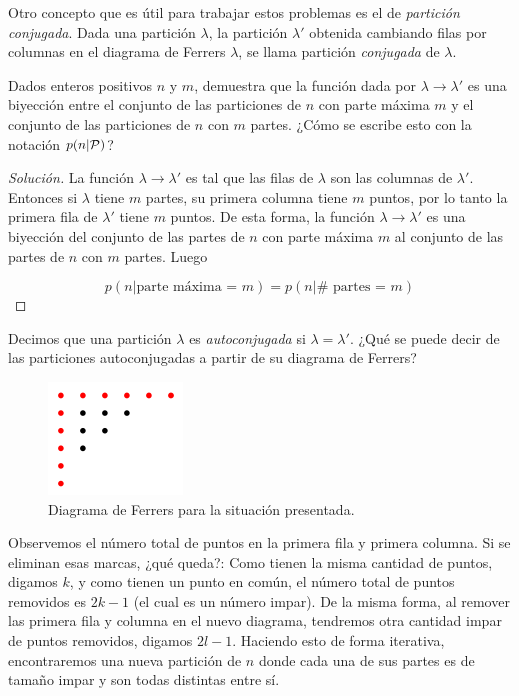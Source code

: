 Otro concepto que es útil para trabajar estos problemas es el de \textit{partición conjugada}. Dada una partición $\lambda$, la partición $\lambda'$ obtenida cambiando filas por columnas en el diagrama de Ferrers $\lambda$, se llama partición \textit{conjugada} de $\lambda$.

\begin{ejer}
    Dados enteros positivos $n$ y $m$, demuestra que la función dada por $\lambda \rightarrow \lambda'$ es una biyección entre el conjunto de las particiones de $n$ con parte máxima $m$ y el conjunto de las particiones de $n$ con $m$ partes. ¿Cómo se escribe esto con la notación $p(n|\mathcal{P})$?
\end{ejer}

\begin{proof}[Solución]
    La función $\lambda \rightarrow \lambda'$ es tal que las filas de $\lambda$ son las columnas de $\lambda'$. Entonces si $\lambda$ tiene $m$ partes, su primera columna tiene $m$ puntos, por lo tanto la primera fila de $\lambda'$ tiene $m$ puntos. De esta forma, la función $\lambda \rightarrow \lambda'$ es una biyección del conjunto de las partes de $n$ con parte máxima $m$ al conjunto de las partes de $n$ con $m$ partes. Luego
    
    \[
    p(n|\text{parte máxima = $m$}) = p(n|\text{$\#$ partes = $m$})
    \]
\end{proof}

Decimos que una partición $\lambda$ es \textit{autoconjugada} si $\lambda = \lambda'$. ¿Qué se puede decir de las particiones autoconjugadas a partir de su diagrama de Ferrers?

\begin{figure}
    \centering
    \includegraphics[scale=0.65]{img/ferrers3.png}
    \caption{Diagrama de Ferrers para la situación presentada.}
    \label{fig:ferrers3}
\end{figure}

Observemos el número total de puntos en la primera fila y primera columna. Si se eliminan esas marcas, ¿qué queda?: Como tienen la misma cantidad de puntos, digamos $k$, y como tienen un punto en común, el número total de puntos removidos es $2k-1$ (el cual es un número impar). De la misma forma, al remover las primera fila y columna en el nuevo diagrama, tendremos otra cantidad impar de puntos removidos, digamos $2l-1$. Haciendo esto de forma iterativa, encontraremos una nueva partición de $n$ donde cada una de sus partes es de tamaño impar y son todas distintas entre sí.

